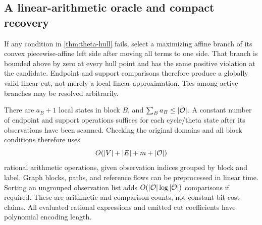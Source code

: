 \subsection{A linear-arithmetic oracle and compact recovery}\label{subsec:theta-oracle}
If any condition in \cref{thm:theta-hull} fails, select a maximizing
affine branch of its convex piecewise-affine left side after moving all
terms to one side. That branch is bounded above by zero at every hull
point and has the same positive violation at the candidate. Endpoint and
support comparisons therefore produce a globally valid linear cut, not
merely a local linear approximation. Ties among active branches may be
resolved arbitrarily.

There are $a_B+1$ local states in block $B$, and
$\sum_Ba_B\le|\mathcal O|$. A constant number of endpoint and support
operations suffices for each cycle/theta state after its observations
have been scanned. Checking the original domains and all block conditions
therefore uses
\begin{equation}\label{eq:theta-oracle-complexity}
 O(|V|+|E|+m+|\mathcal O|)
\end{equation}
rational arithmetic operations, given observation indices grouped by
block and label. Graph blocks, paths, and reference flows can be
preprocessed in linear time. Sorting an ungrouped observation list adds
$O(|\mathcal O|\log|\mathcal O|)$ comparisons if required. These are arithmetic and
comparison counts, not constant-bit-cost claims. All evaluated rational
expressions and emitted cut coefficients have polynomial encoding length.

